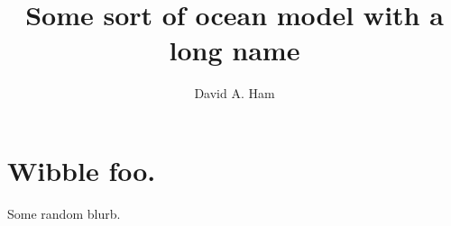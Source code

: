 \documentclass{imposter}
\title{Some sort of ocean model with a long name}
\author{David A. Ham}
\begin{document}
\section{Wibble foo.}

Some random blurb. 
\IMposterargs
\end{document}

